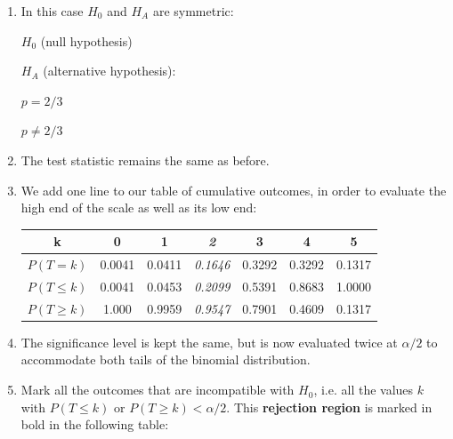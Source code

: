 \begin{enumerate}

\item In this case $H_0$ and $H_{\!A}$ are symmetric:\medskip

\noindent\begin{minipage}{.4\textwidth}
  $H_0$ (null hypothesis)
  
  \vspace{1em}
  
  $H_{\!A}$ (alternative hypothesis):
\end{minipage}
\begin{minipage}{.2\textwidth}
\end{minipage}
\begin{minipage}{.2\textwidth}
  $p=2/3$
  
  \vspace{1em}
  
  ${p}\neq{2/3}$
\end{minipage}
\begin{minipage}{.2\textwidth}
\end{minipage}\medskip

\item The test statistic remains the same as before.

\item We add one line to our table of cumulative outcomes, in order to
  evaluate the high end of the scale as well as its low end:

  \begin{center}
    \begin{tabular}{ccccccc}
      k & 0 & 1 & \textit{2} & 3 & 4 & 5 \\ \hline
      $P(T=k)$ & 0.0041 & 0.0411 & \textit{0.1646} & 0.3292 & 0.3292 & 0.1317 \\
      $P({T}\leq{k})$ & 0.0041 & 0.0453 & \textit{0.2099} &
      0.5391 & 0.8683 & 1.0000 \\
      $P({T}\geq{k})$ & 1.000 & 0.9959 & \textit{0.9547} &
      0.7901 & 0.4609 & 0.1317
    \end{tabular}
  \end{center}
  
\item The significance level is kept the same, but is now evaluated
  twice at $\alpha/2$ to accommodate both tails of the binomial
  distribution.

\item Mark all the outcomes that are incompatible with $H_0$, i.e. all
  the values $k$ with $P(T\leq{k})$ or $P(T\geq{k}) <\alpha/2$.  This
    \textbf{rejection region} is marked in bold in the following
    table:


\end{enumerate}
